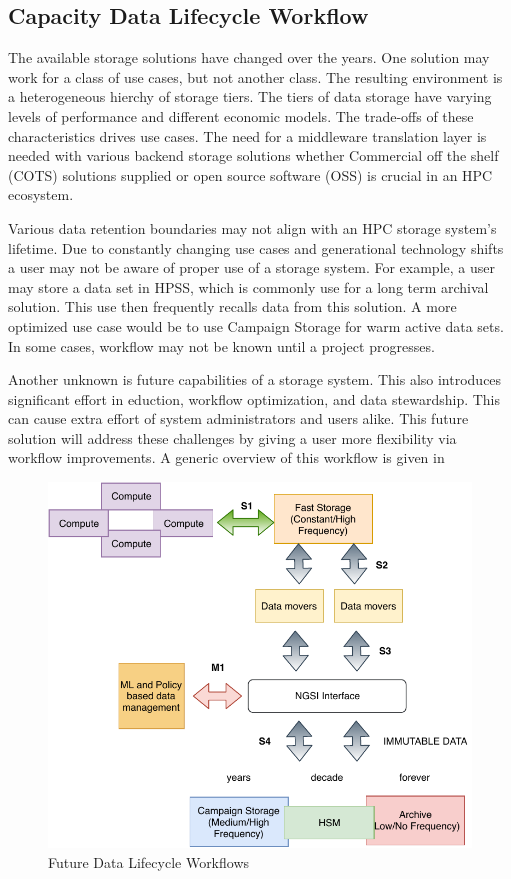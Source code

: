 \documentclass[a4paper, twocolumn]{article}
\begin{document}
\subsection{Capacity Data Lifecycle Workflow}
The available storage solutions have changed over the years. One solution may work for a class of use cases, but not another class. The resulting environment is a heterogeneous hierchy of storage tiers. The tiers of data storage have varying levels of performance and different economic models. The trade-offs of these characteristics drives use cases. The need for a middleware translation layer is needed with various backend storage solutions whether Commercial off the shelf (COTS) solutions supplied or open source software (OSS) is crucial in an HPC ecosystem.

Various data retention boundaries may not align with an HPC storage system’s lifetime. Due to constantly changing use cases and generational technology shifts a user may not be aware of proper use of a storage system. For example, a user may store a data set in HPSS, which is commonly use for a long term archival solution. This use then frequently recalls data from this solution. A more optimized use case would be to use Campaign Storage for warm active data sets. In some cases, workflow may not be known until a project progresses.

Another unknown is future capabilities of a storage system. This also introduces significant effort in eduction, workflow optimization, and data stewardship. This can cause extra effort of system administrators and users alike. This future solution will address these challenges by giving a user more flexibility via workflow improvements. A generic overview of this workflow is given in 

\begin{figure}[b]
  \includegraphics[width=0.75\columnwidth]{datalifecycle-workflow}
  \caption{Future Data Lifecycle Workflows}
  \label{fig:dataLifecycle}
\end{figure}
\end{document}
